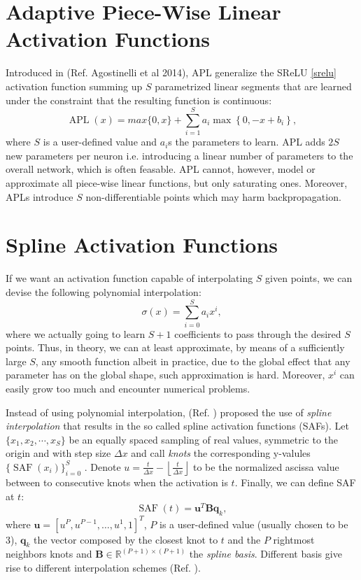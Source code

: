\documentclass[LaM,binding=0.6cm]{./packages/sapthesis/sapthesis}
\begin{document}
    \section{Adaptive Piece-Wise Linear Activation Functions}
            Introduced in (Ref. Agostinelli et al 2014), APL generalize the SReLU \ref{srelu} activation function summing up $S$ parametrized linear segments that are
            learned under the constraint that the resulting function is continuous:
            \begin{equation}
                \operatorname{APL}(x) = max \{0, x\} + \sum_{i=1}^{S} a_{i} \max \left\{0,-x+b_{i}\right\},
            \end{equation}
            where $S$ is a user-defined value and $a_i$s the parameters to learn. APL adds $2S$ new parameters per neuron i.e. introducing a linear number of parameters to the overall network, which is often feasable.
            APL cannot, however, model or approximate all piece-wise linear functions, but only saturating ones. Moreover, APLs introduce $S$ non-differentiable points which may harm backpropagation.
    \section{Spline Activation Functions}
    If we want an activation function capable of interpolating $S$ given points, we can devise the following polynomial interpolation:
    \begin{equation}
        \sigma(x) = \sum_{i=0}^{S} a_{i} x^{i},
    \end{equation}
    where we actually going to learn $S+1$ coefficients to pass through the desired $S$ points. Thus, in theory, we can at least approximate, by means of
    a sufficiently large $S$, any smooth function albeit in practice, due to the global effect that any parameter has on the global shape, such approximation
    is hard. Moreover, $x^i$ can easily grow too much and encounter numerical problems.
    
    Instead of using polynomial interpolation, (Ref. ) proposed the use of \textit{spline interpolation} that results in the so called spline activation functions (SAFs).
    Let $\{ x_1, x_2, \cdots, x_S \}$ be an equally spaced sampling of real values, symmetric to the origin and with step size $\Delta x$ and call \textit{knots}
    the corresponding y-valules $\{\operatorname{SAF}(x_i)\}^S_{i=0}$ . Denote $u=\frac{t}{\Delta x}-\left\lfloor\frac{t}{\Delta x}\right\rfloor$ to be the normalized ascissa 
    value between to consecutive knots when the activation is $t$. Finally, we can define SAF at $t$:
    \begin{equation}
        \label{saf}
        \operatorname{SAF}(t)=\mathbf{u}^{T} \mathbf{B} \mathbf{q}_{k},
    \end{equation}
    where $\mathbf{u}=\left[u^{P}, u^{P-1}, \ldots, u^{1}, 1\right]^{T}$, $P$ is a user-defined value (usually chosen to be 3), $\mathbf{q}_{k}$ the vector composed by
    the closest knot to $t$ and the $P$ rightmost neighbors knots and $\mathbf{B} \in \mathbb{R}^{(P+1) \times(P+1)}$ the \textit{spline basis}. Different basis give 
    rise to different interpolation schemes (Ref. ).
    
\end{document}
